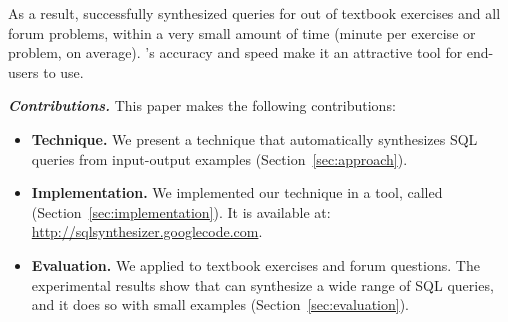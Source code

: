 As a result, \ourtool successfully synthesized queries
for \solexnum out of \exnum textbook exercises and
all \pnum forum problems, within a very
small amount of time (\avgtime minute per exercise or problem, on average).
\ourtool's accuracy and speed make it an attractive
tool for end-users to use.%


\vspace{1mm}
\noindent\textbf{\textit{Contributions.}}
This paper makes the following contributions:

\begin{itemize}

\item \textbf{Technique.} We present a technique that automatically
synthesizes SQL queries from input-output examples
(Section~\ref{sec:approach}).

\item \textbf{Implementation.} We implemented our technique in a
tool, called \ourtool (Section~\ref{sec:implementation}). It is
available at: \url{http://sqlsynthesizer.googlecode.com}.

\item \textbf{Evaluation.} We applied \ourtool
to \exnum textbook exercises and \pnum 
forum questions.
The experimental results show that \ourtool can synthesize
a wide range of SQL queries, and it does so with
small examples (Section~\ref{sec:evaluation}).
\end{itemize}
